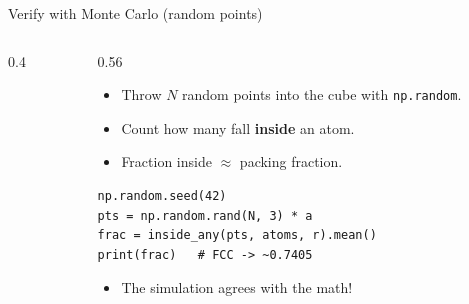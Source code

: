 \documentclass[aspectratio=169]{beamer}
\begin{document}
\begin{frame}[fragile]{Verify with Monte Carlo (random points)}
  \begin{columns}[T]
    \begin{column}{0.4\textwidth}
      \begin{center}
      \end{center}
    \end{column}
    \begin{column}{0.56\textwidth}
      \begin{itemize}
        \item Throw $N$ random points into the cube with \texttt{np.random}.
        \item Count how many fall \textbf{inside} an atom.
        \item Fraction inside $\approx$ packing fraction.
      \end{itemize}
      \vspace{0.2cm}
      \begin{lstlisting}[basicstyle=\ttfamily\scriptsize]
np.random.seed(42)
pts = np.random.rand(N, 3) * a
frac = inside_any(pts, atoms, r).mean()
print(frac)   # FCC -> ~0.7405
      \end{lstlisting}
      \begin{itemize}
        \item The simulation agrees with the math!
      \end{itemize}
    \end{column}
  \end{columns}
\end{frame}
\end{document}
